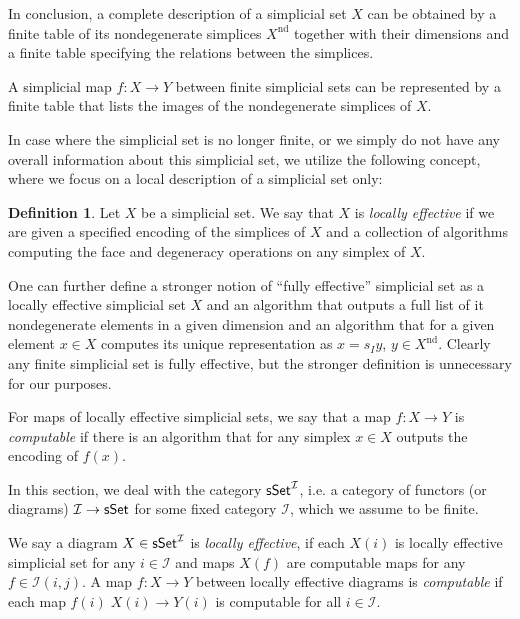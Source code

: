\documentclass[12pt,a4wide]{article}
\theoremstyle{plain}
\theoremstyle{definition}
\newtheorem{Def}[thm]{Definition}
\newcommand{\heading}[1]{\vspace{1ex}\par\noindent{\bf\boldmath #1}}
\renewcommand\:{\colon}
\newcommand{\icat}{\mathcal I}
\newcommand{\ndg}{\mathrm{nd}}
\begin{document}
In conclusion, a complete description of a simplicial set $X$ can be obtained by a  finite table of its nondegenerate simplices $X^\ndg$ together with their dimensions and a finite table specifying the relations between the simplices.

A simplicial map $f \: X \to Y$ between finite simplicial sets can be represented by a finite table that lists the images of the nondegenerate simplices of $X$.

In case where the simplicial set is no longer finite, or we simply do not have any overall information about this simplicial set, we utilize the following concept, where we focus on a local description of a simplicial set only: 

\begin{Def}
Let $X$ be a simplicial set. We say that $X$ is \emph{locally effective} 
if we are given a specified encoding of the simplices of $X$ and a collection of algorithms computing the face and degeneracy operations on any simplex of $X$. 
\end{Def}

One can further define a stronger notion of ``fully effective'' simplicial set as a locally effective simplicial set $X$ and an algorithm that outputs a full list of it nondegenerate elements in a given dimension and an algorithm that for a given element $x \in X$ computes its unique representation as $x =  s_{I} y$, $y\in X^\ndg$. Clearly any finite simplicial set is fully effective, but the stronger definition is unnecessary for our purposes.

For maps of locally effective simplicial sets, we say that a map $f\: X \to Y$ is \emph{computable} if there is an algorithm that for any simplex $x\in X$ outputs the encoding of $f(x)$.




\heading{Diagrams of simplicial sets}
In this section, we deal with the category $\sSet^ \icat$, i.e. a category of functors (or diagrams) $\icat \to \sSet$ for some fixed category $\icat$, which we assume to be finite. 

We say a diagram $X \in \sSet^ \icat$ is \emph{locally effective}, if each $X(i)$ is locally effective simplicial set for any $i\in \icat$ and maps $X(f)$ are computable maps for any $f\in \icat(i,j)$. A map $f\: X \to Y$ between locally effective diagrams is \emph{computable} if each map $f(i)\; X(i) \to Y(i)$ is computable for all $i \in \icat$.
\end{document}
